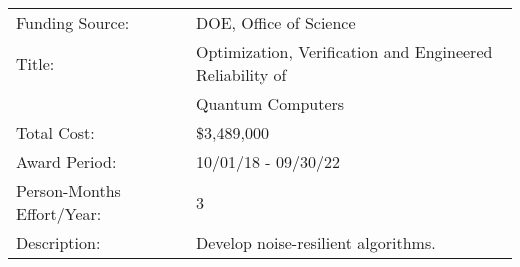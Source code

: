 \documentclass[10pt]{article}
\begin{document}
\begin{description}
\item
\begin{tabularx}{\linewidth}{lX}
Funding Source:         & DOE, Office of Science\\
Title:                  & Optimization, Verification and Engineered Reliability of \\
& Quantum Computers \\
Total Cost:             & \$3,489,000 \\
Award Period:           & 10/01/18 - 09/30/22 \\
Person-Months Effort/Year: & 3\\
Description:            & Develop noise-resilient algorithms. \\
\end{tabularx}



\end{description}
\end{document}
